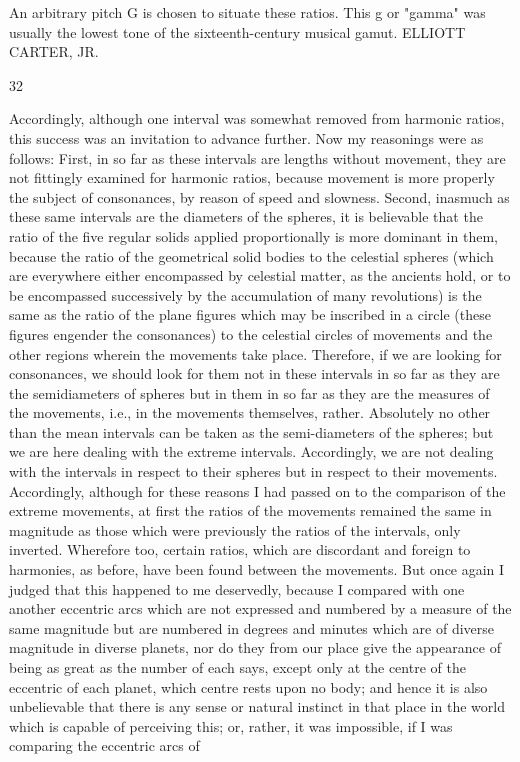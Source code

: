 \documentclass{article}
\begin{document}
An arbitrary pitch G is chosen to situate these ratios. This g or "gamma" was usually the lowest tone of
the sixteenth-century musical gamut.
ELLIOTT CARTER, JR.


32

Accordingly, although one interval was somewhat removed from
harmonic ratios, this success was an invitation to advance further. Now
my reasonings were as follows: First, in so far as these intervals are
lengths without movement, they are not fittingly examined for harmonic
ratios, because movement is more properly the subject of consonances,
by reason of speed and slowness. Second, inasmuch as these same
intervals are the diameters of the spheres, it is believable that the ratio of
the five regular solids applied proportionally is more dominant in them,
because the ratio of the geometrical solid bodies to the celestial spheres
(which are everywhere either encompassed by celestial matter, as the
ancients hold, or to be encompassed successively by the accumulation of
many revolutions) is the same as the ratio of the plane figures which may
be inscribed in a circle (these figures engender the consonances) to the
celestial circles of movements and the other regions wherein the
movements take place. Therefore, if we are looking for consonances, we
should look for them not in these intervals in so far as they are the
semidiameters of spheres but in them in so far as they are the measures
of the movements, i.e., in the movements themselves, rather. Absolutely
no other than the mean intervals can be taken as the semi-diameters of
the spheres; but we are here dealing with the extreme intervals.
Accordingly, we are not dealing with the intervals in respect to their
spheres but in respect to their movements.
Accordingly, although for these reasons I had passed on to the
comparison of the extreme movements, at first the ratios of the
movements remained the same in magnitude as those which were
previously the ratios of the intervals, only inverted. Wherefore too,
certain ratios, which are discordant and foreign to harmonies, as before,
have been found between the movements. But once again I judged that
this happened to me deservedly, because I compared with one another
eccentric arcs which are not expressed and numbered by a measure of
the same magnitude but are numbered in degrees and minutes which are
of diverse magnitude in diverse planets, nor do they from our place give
the appearance of being as great as the number of each says, except only
at the centre of the eccentric of each planet, which centre rests upon no
body; and hence it is also unbelievable that there is any sense or natural
instinct in that place in the world which is capable of perceiving this; or,
rather, it was impossible, if I was comparing the eccentric arcs of
\end{document}
